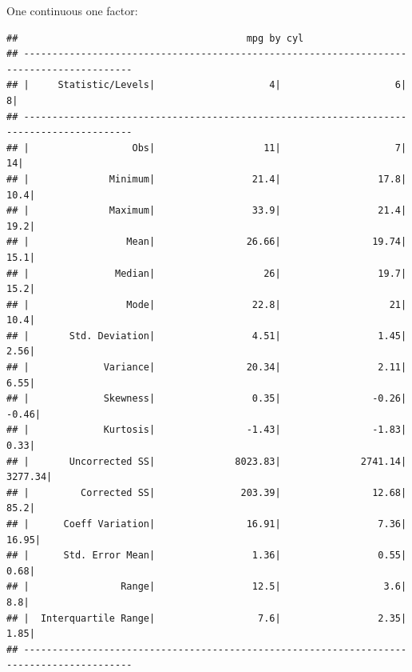 \documentclass[
]{book}
\newenvironment{Shaded}{\begin{snugshade}}{\end{snugshade}}
\newcommand{\FunctionTok}[1]{\textcolor[rgb]{0.00,0.00,0.00}{#1}}
\newcommand{\NormalTok}[1]{#1}
\newcommand{\OtherTok}[1]{\textcolor[rgb]{0.56,0.35,0.01}{#1}}
\newcommand{\SpecialCharTok}[1]{\textcolor[rgb]{0.00,0.00,0.00}{#1}}
\begin{document}
One continuous one factor:

\begin{Shaded}
\end{Shaded}

\begin{verbatim}
##                                        mpg by cyl                                         
## -----------------------------------------------------------------------------------------
## |     Statistic/Levels|                    4|                    6|                    8|
## -----------------------------------------------------------------------------------------
## |                  Obs|                   11|                    7|                   14|
## |              Minimum|                 21.4|                 17.8|                 10.4|
## |              Maximum|                 33.9|                 21.4|                 19.2|
## |                 Mean|                26.66|                19.74|                 15.1|
## |               Median|                   26|                 19.7|                 15.2|
## |                 Mode|                 22.8|                   21|                 10.4|
## |       Std. Deviation|                 4.51|                 1.45|                 2.56|
## |             Variance|                20.34|                 2.11|                 6.55|
## |             Skewness|                 0.35|                -0.26|                -0.46|
## |             Kurtosis|                -1.43|                -1.83|                 0.33|
## |       Uncorrected SS|              8023.83|              2741.14|              3277.34|
## |         Corrected SS|               203.39|                12.68|                 85.2|
## |      Coeff Variation|                16.91|                 7.36|                16.95|
## |      Std. Error Mean|                 1.36|                 0.55|                 0.68|
## |                Range|                 12.5|                  3.6|                  8.8|
## |  Interquartile Range|                  7.6|                 2.35|                 1.85|
## -----------------------------------------------------------------------------------------
\end{verbatim}
\end{document}
